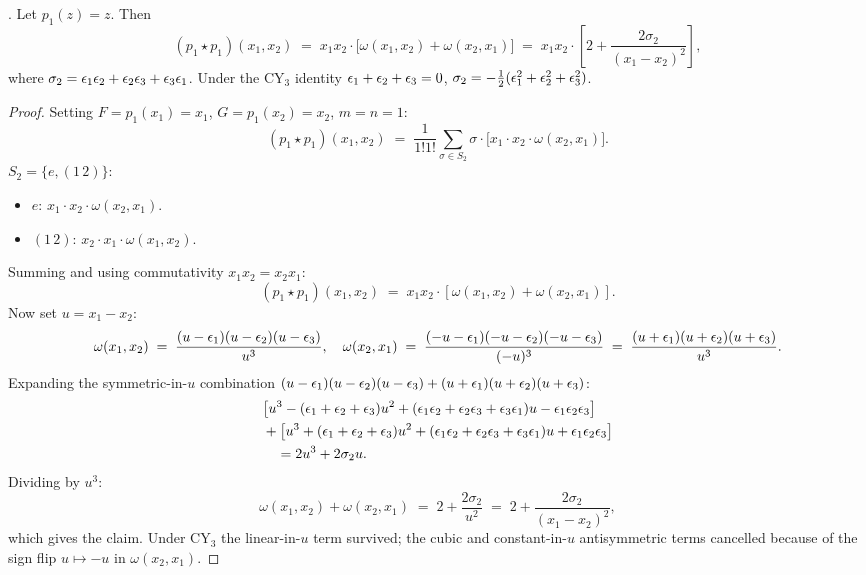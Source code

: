 \begin{proposition}[Verification at $m = n = 1$: $p_1 \star p_1$]
\label{opus:prop:p1-star-p1}
\ClaimStatusDerivation.
Let $p_1(z) = z$. Then
\[
 (p_1 \star p_1)(x_1, x_2) \;=\; x_1 x_2 \cdot \bigl[\omega(x_1, x_2) + \omega(x_2, x_1)\bigr]
 \;=\; x_1 x_2 \cdot \left[2 + \frac{2 \sigma_2}{(x_1 - x_2)^2}\right],
\]
where $\sigma_2 = \epsilon_1\epsilon_2 + \epsilon_2\epsilon_3 + \epsilon_3\epsilon_1$. Under the CY$_3$ identity
$\epsilon_1 + \epsilon_2 + \epsilon_3 = 0$, $\sigma_2 = -\tfrac{1}{2}(\epsilon_1^2 + \epsilon_2^2 + \epsilon_3^2)$.
\end{proposition}

\begin{proof}
Setting $F = p_1(x_1) = x_1$, $G = p_1(x_2) = x_2$, $m = n = 1$:
\[
 (p_1 \star p_1)(x_1, x_2) \;=\; \frac{1}{1!1!} \sum_{\sigma \in S_2}
 \sigma \cdot \bigl[x_1 \cdot x_2 \cdot \omega(x_2, x_1)\bigr].
\]
$S_2 = \{e, (1\,2)\}$:
\begin{itemize}
\item $e$: $x_1 \cdot x_2 \cdot \omega(x_2, x_1)$.
\item $(1\,2)$: $x_2 \cdot x_1 \cdot \omega(x_1, x_2)$.
\end{itemize}
Summing and using commutativity $x_1 x_2 = x_2 x_1$:
\[
 (p_1 \star p_1)(x_1, x_2) \;=\; x_1 x_2 \cdot [\omega(x_1, x_2) + \omega(x_2, x_1)].
\]
Now set $u = x_1 - x_2$:
\[
 \omega(x_1, x_2) \;=\; \frac{(u - \epsilon_1)(u - \epsilon_2)(u - \epsilon_3)}{u^3},
 \quad
 \omega(x_2, x_1) \;=\; \frac{(-u - \epsilon_1)(-u - \epsilon_2)(-u - \epsilon_3)}{(-u)^3}
 \;=\; \frac{(u + \epsilon_1)(u + \epsilon_2)(u + \epsilon_3)}{u^3}.
\]
Expanding the symmetric-in-$u$ combination $(u - \epsilon_1)(u - \epsilon_2)(u - \epsilon_3) + (u + \epsilon_1)(u + \epsilon_2)(u + \epsilon_3)$:
\begin{align*}
&\bigl[u^3 - (\epsilon_1 + \epsilon_2 + \epsilon_3) u^2 + (\epsilon_1\epsilon_2 + \epsilon_2\epsilon_3 + \epsilon_3\epsilon_1) u - \epsilon_1\epsilon_2\epsilon_3\bigr] \\
&+ \bigl[u^3 + (\epsilon_1 + \epsilon_2 + \epsilon_3) u^2 + (\epsilon_1\epsilon_2 + \epsilon_2\epsilon_3 + \epsilon_3\epsilon_1) u + \epsilon_1\epsilon_2\epsilon_3\bigr] \\
&\quad = 2 u^3 + 2 \sigma_2 u.
\end{align*}
Dividing by $u^3$:
\[
 \omega(x_1, x_2) + \omega(x_2, x_1) \;=\; 2 + \frac{2 \sigma_2}{u^2}
 \;=\; 2 + \frac{2 \sigma_2}{(x_1 - x_2)^2},
\]
which gives the claim. Under CY$_3$ the linear-in-$u$ term survived; the cubic and
constant-in-$u$ antisymmetric terms cancelled because of the sign flip $u \mapsto -u$
in $\omega(x_2, x_1)$.
\end{proof}


